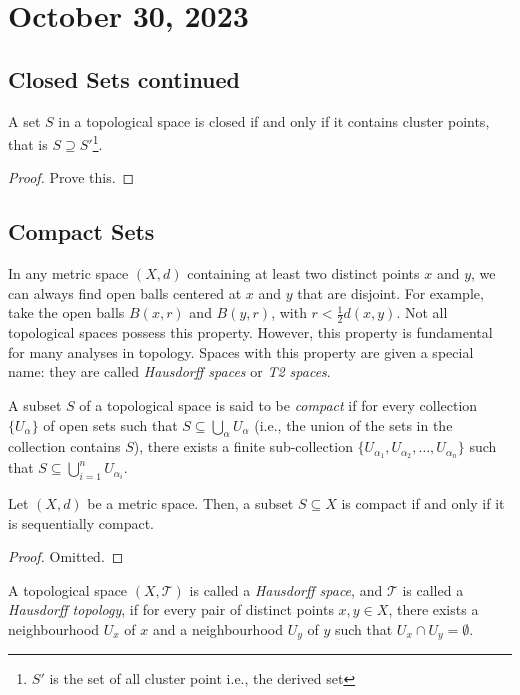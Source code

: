 \newpage
\section{October 30, 2023}
\subsection{Closed Sets continued}
\begin{theorem}
    A set $S$ in a topological space is closed if and only if it contains cluster points, that is $S \supseteq S'$\footnote{$S'$ is the set of all cluster point i.e., the derived set}.
\end{theorem}
\begin{proof}
    Prove this.
\end{proof}

\subsection{Compact Sets}
In any metric space \( (X,d) \) containing at least two distinct points \( x \) and \( y \), we can always find open balls centered at \( x \) and \( y \) that are disjoint. For example, take the open balls \( B(x, r) \) and \( B(y, r) \), with \( r < \frac{1}{2} d(x, y) \). Not all topological spaces possess this property. However, this property is fundamental for many analyses in topology. Spaces with this property are given a special name: they are called \textit{Hausdorff spaces} or \textit{T2 spaces}.


\begin{definition}[Compactness]
    A subset \( S \) of a topological space is said to be \textit{compact} if for every collection \(\{ U_\alpha \}\) of open sets such that \( S \subseteq \bigcup_\alpha U_\alpha \) (i.e., the union of the sets in the collection contains \( S \)), there exists a finite sub-collection \(\{ U_{\alpha_1}, U_{\alpha_2}, \ldots, U_{\alpha_n} \}\) such that \( S \subseteq \bigcup_{i=1}^n U_{\alpha_i} \).
\end{definition}

\begin{theorem}
    Let $(X,d)$ be a metric space. Then, a subset $S \subseteq X$ is compact if and only if it is sequentially compact.
\end{theorem}
\begin{proof}
    Omitted.
\end{proof}


\begin{definition}
    A topological space \( (X, \mathcal{T}) \) is called a \textit{Hausdorff space}, and \( \mathcal{T} \) is called a \textit{Hausdorff topology}, if for every pair of distinct points \( x, y \in X \), there exists a neighbourhood \( U_x \) of \( x \) and a neighbourhood \( U_y \) of \( y \) such that \( U_x \cap U_y = \emptyset \).
\end{definition}

